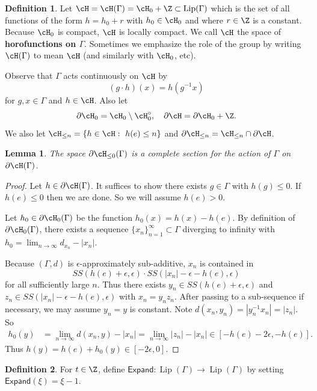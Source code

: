 \documentclass[12pt]{article}
\theoremstyle{plain}
\newtheorem{lem}[thm]{Lemma}
\theoremstyle{definition}
\newtheorem{defn}{Definition}
\theoremstyle{remark}
\newcommand{\G}{\Gamma}
\newcommand{\eps}{\epsilon}
\newcommand{\Add}{\mathsf{Expand}}
\newcommand\Lip{\operatorname{Lip}}
\begin{document}
\begin{defn}\label{D:horospace}
    Let $\cH=\cH(\G)=\cH_0+\Z \subset \Lip(\G)$ which is the set of all functions of the form $h=h_0+r$ with $h_0 \in \cH_0 $ and where $r\in \Z$ is a constant. Because $\cH_0$ is compact, $\cH$ is locally compact. We call $\cH$ the space of {\bf horofunctions on $\G$}. Sometimes we emphasize the role of the group by writing $\cH(\Gamma)$ to mean $\cH$ (and similarly with $\cH_0$, etc). 
\end{defn}
Observe that $\G$ acts continuously on $\cH$ by 
$$(g\cdot h)(x)=h(g^{-1}x)$$
for $g,x\in \G$ and $h \in \cH$. Also let $$\partial \cH_0 = \cH_0 \setminus \cH^{\circ}_0, \quad \partial \cH = \partial\cH_0 + \Z.$$
We also let $\cH_{\le n} = \{h \in \cH:~h(e)\le n\}$ and 
$\partial \cH_{\le n} = \cH_{\le n} \cap \partial \cH$.

\begin{lem}\label{L:section}
    The space $\partial \cH_{\le 0}(\G)$ is a complete section for the action of $\G$ on $\partial \cH(\G)$.
\end{lem}

\begin{proof}
    Let $h \in \partial \cH(\G)$. It suffices to show there exists $g\in \G$ with $h(g)\le 0$. If $h(e)\le 0$ then we are done. So we will assume $h(e)>0$. 

    Let $h_0 \in \partial \cH_0(\G)$ be the function $h_0(x)=h(x)-h(e)$. By definition of $\partial \cH_0(\G)$, there exists a sequence $\{x_n\}_{n=1}^\infty \subset \G$ diverging to infinity with $h_0 = \lim_{n\to\infty} d_{x_n} - |x_n|$. 

    Because $(\G,d)$ is $\eps$-approximately sub-additive, $x_n$ is contained in
    $$SS(h(e)+\eps,\eps) \cdot SS(|x_n|-\eps-h(e),\eps)$$
    for all sufficiently large $n$.    Thus there exists $y_n \in SS(h(e)+\eps,\eps)$ and $z_n \in SS(|x_n|-\eps-h(e),\eps) $ with $x_n=y_nz_n.$ After passing to a sub-sequence if necessary, we may assume $y_n=y$ is constant. Note $d(x_n,y_n) = |y_n^{-1}x_n|=|z_n|$. So
    \begin{align*}
h_0(y) &= \lim_{n\to\infty} d(x_n,y) - |x_n| =   \lim_{n\to\infty} |z_n| - |x_n| 
\in [-h(e)-2\eps, -h(e)].
    \end{align*}
Thus $h(y) = h(e)+h_0(y)\in [-2\eps,0]$.  
\end{proof}


\begin{defn}
For $t\in \Z$, define $\Add:\Lip(\G)  \to \Lip(\G)$ by setting $\Add(\xi)=\xi-1$.
\end{defn}
\end{document}
